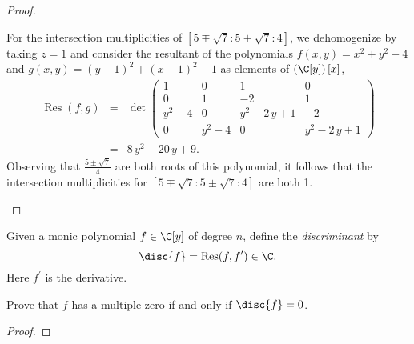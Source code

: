 \documentclass[10pt]{amsart}
\begin{document}
\begin{thm}
\begin{proof}
\begin{enumerate}[(a)]
      For the intersection multiplicities of $[5 \mp \sqrt{7} : 5 \pm \sqrt{7} : 4]$, we dehomogenize by taking $z = 1$ and consider the resultant of the polynomials $f(x,y) = x^{2} + y^{2} - 4$ and $g(x,y) = {\left(y - 1\right)}^{2} + {\left(x - 1\right)}^{2} - 1$ as elements of $\left(\C[y]\right)[x]$,
      \begin{eqnarray*}
        \operatorname{Res}(f,g) &=& \det\left(\begin{array}{cccc}
          1 & 0 & 1 & 0 \\
          0 & 1 & -2 & 1 \\
          y^{2} - 4 & 0 & y^{2} - 2 \, y + 1 & -2 \\
          0 & y^{2} - 4 & 0 & y^{2} - 2 \, y + 1
        \end{array}\right) \\
        &=& 8 \, y^{2} - 20 \, y + 9.
      \end{eqnarray*}
      Observing that $\frac{5 \pm \sqrt{7}}{4}$ are both roots of this polynomial, it follows that the intersection multiplicities for $[5 \mp \sqrt{7} : 5 \pm \sqrt{7} : 4]$ are both 1.
    \end{enumerate}
  \end{proof}
\end{thm}

\begin{thm}
  Given a monic polynomial $f \in \C[y]$ of degree $n$, define the {\it discriminant} by
  $$\disc{f} = \operatorname{Res}(f, f^\prime) \in \C.$$
  Here $f^\prime$ is the derivative.
  
  Prove that $f$ has a multiple zero if and only if $\disc{f} = 0$.
  \begin{proof}
  \end{proof}
\end{thm}
\end{document}
